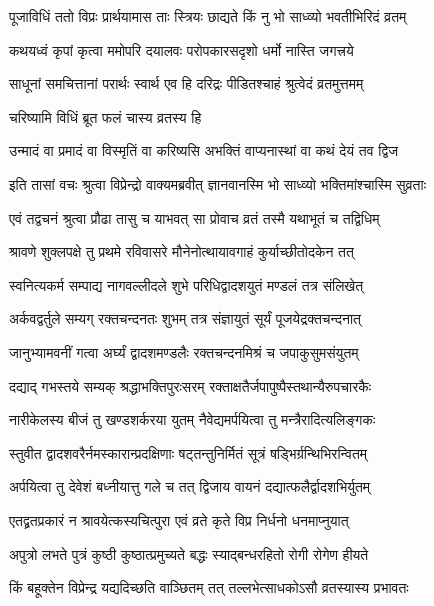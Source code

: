 \twolineshloka
{पूजाविधिं ततो विप्रः प्रार्थयामास ताः स्त्रियः}
{छाद्यते किं नु भो साध्व्यो भवतीभिरिदं व्रतम्} %

\twolineshloka
{कथयध्वं कृपां कृत्वा ममोपरि दयालवः}
{परोपकारसदृशो धर्मो नास्ति जगत्त्रये} %

\twolineshloka
{साधूनां समचित्तानां परार्थः स्वार्थ एव हि}
{दरिद्रः पीडितश्चाहं श्रुत्वेदं व्रतमुत्तमम्} %

\onelineshloka
{चरिष्यामि विधिं ब्रूत फलं चास्य व्रतस्य हि} %


\twolineshloka
{उन्मादं वा प्रमादं वा विस्मृतिं वा करिष्यसि}
{अभक्तिं वाप्यनास्थां वा कथं देयं तव द्विज} %

\twolineshloka
{इति तासां वचः श्रुत्वा विप्रेन्द्रो वाक्यमब्रवीत्}
{ज्ञानवानस्मि भो साध्व्यो भक्तिमांश्चास्मि सुव्रताः} %

\twolineshloka
{एवं तद्वचनं श्रुत्वा प्रौढा तासु च याभवत्}
{सा प्रोवाच व्रतं तस्मै यथाभूतं च तद्विधिम्} %

\twolineshloka
{श्रावणे शुक्लपक्षे तु प्रथमे रविवासरे}
{मौनेनोत्थायावगाहं कुर्याच्छीतोदकेन तत्} %

\twolineshloka
{स्वनित्यकर्म सम्पाद्य नागवल्लीदले शुभे}
{परिधिद्वादशयुतं मण्डलं तत्र संलिखेत्} %

\twolineshloka
{अर्कवद्वर्तुले सम्यग् रक्तचन्दनतः शुभम्}
{तत्र संज्ञायुतं सूर्यं पूजयेद्रक्तचन्दनात्} %

\twolineshloka
{जानुभ्यामवनीं गत्वा अर्घ्यं द्वादशमण्डलैः}
{रक्तचन्दनमिश्रं च जपाकुसुमसंयुतम्} %

\twolineshloka
{दद्याद् गभस्तये सम्यक् श्रद्धाभक्तिपुरःसरम्}
{रक्ताक्षतैर्जपापुष्पैस्तथान्यैरुपचारकैः} %

\twolineshloka
{नारीकेलस्य बीजं तु खण्डशर्करया युतम्}
{नैवेद्यमर्पयित्वा तु मन्त्रैरादित्यलिङ्गकः} %

\twolineshloka
{स्तुवीत द्वादशवरैर्नमस्कारान्प्रदक्षिणाः}
{षट्तन्तुनिर्मितं सूत्रं षड्भिर्ग्रन्थिभिरन्वितम्} %

\twolineshloka
{अर्पयित्वा तु देवेशं बध्नीयात्तु गले च तत्}
{द्विजाय वायनं दद्यात्फलैर्द्वादशभिर्युतम्} %

\twolineshloka
{एतद्व्रतप्रकारं न श्रावयेत्कस्यचित्पुरा}
{एवं व्रते कृते विप्र निर्धनो धनमाप्नुयात्} %

\twolineshloka
{अपुत्रो लभते पुत्रं कुष्ठी कुष्ठात्प्रमुच्यते}
{बद्धः स्याद्बन्धरहितो रोगी रोगेण हीयते} %

\twolineshloka
{किं बहूक्तेन विप्रेन्द्र यद्यदिच्छति वाञ्छितम्}
{तत् तल्लभेत्साधकोऽसौ व्रतस्यास्य प्रभावतः} %

